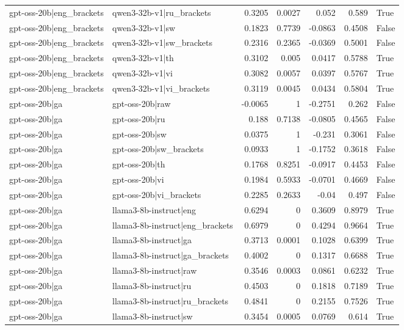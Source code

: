 \begin{table}
\begin{tabular}{l l r r r r l}
gpt-oss-20b|eng_brackets & qwen3-32b-v1|ru_brackets & 0.3205 & 0.0027 & 0.052 & 0.589 & True \\
gpt-oss-20b|eng_brackets & qwen3-32b-v1|sw & 0.1823 & 0.7739 & -0.0863 & 0.4508 & False \\
gpt-oss-20b|eng_brackets & qwen3-32b-v1|sw_brackets & 0.2316 & 0.2365 & -0.0369 & 0.5001 & False \\
gpt-oss-20b|eng_brackets & qwen3-32b-v1|th & 0.3102 & 0.005 & 0.0417 & 0.5788 & True \\
gpt-oss-20b|eng_brackets & qwen3-32b-v1|vi & 0.3082 & 0.0057 & 0.0397 & 0.5767 & True \\
gpt-oss-20b|eng_brackets & qwen3-32b-v1|vi_brackets & 0.3119 & 0.0045 & 0.0434 & 0.5804 & True \\
gpt-oss-20b|ga & gpt-oss-20b|raw & -0.0065 & 1 & -0.2751 & 0.262 & False \\
gpt-oss-20b|ga & gpt-oss-20b|ru & 0.188 & 0.7138 & -0.0805 & 0.4565 & False \\
gpt-oss-20b|ga & gpt-oss-20b|sw & 0.0375 & 1 & -0.231 & 0.3061 & False \\
gpt-oss-20b|ga & gpt-oss-20b|sw_brackets & 0.0933 & 1 & -0.1752 & 0.3618 & False \\
gpt-oss-20b|ga & gpt-oss-20b|th & 0.1768 & 0.8251 & -0.0917 & 0.4453 & False \\
gpt-oss-20b|ga & gpt-oss-20b|vi & 0.1984 & 0.5933 & -0.0701 & 0.4669 & False \\
gpt-oss-20b|ga & gpt-oss-20b|vi_brackets & 0.2285 & 0.2633 & -0.04 & 0.497 & False \\
gpt-oss-20b|ga & llama3-8b-instruct|eng & 0.6294 & 0 & 0.3609 & 0.8979 & True \\
gpt-oss-20b|ga & llama3-8b-instruct|eng_brackets & 0.6979 & 0 & 0.4294 & 0.9664 & True \\
gpt-oss-20b|ga & llama3-8b-instruct|ga & 0.3713 & 0.0001 & 0.1028 & 0.6399 & True \\
gpt-oss-20b|ga & llama3-8b-instruct|ga_brackets & 0.4002 & 0 & 0.1317 & 0.6688 & True \\
gpt-oss-20b|ga & llama3-8b-instruct|raw & 0.3546 & 0.0003 & 0.0861 & 0.6232 & True \\
gpt-oss-20b|ga & llama3-8b-instruct|ru & 0.4503 & 0 & 0.1818 & 0.7189 & True \\
gpt-oss-20b|ga & llama3-8b-instruct|ru_brackets & 0.4841 & 0 & 0.2155 & 0.7526 & True \\
gpt-oss-20b|ga & llama3-8b-instruct|sw & 0.3454 & 0.0005 & 0.0769 & 0.614 & True \\

\end{tabular}
\end{table}

